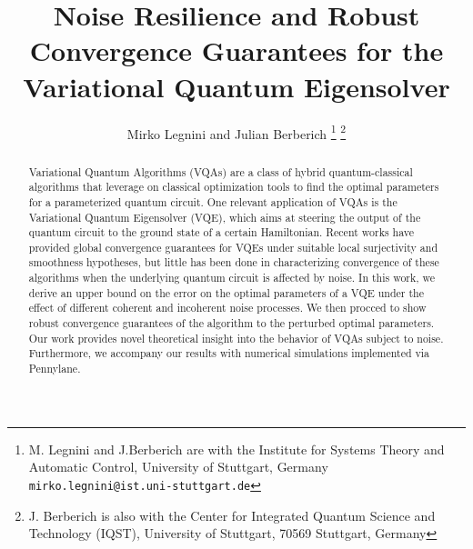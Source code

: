 \documentclass[letterpaper, 10 pt]{IEEEtran}  %
\title{\LARGE \bf
Noise Resilience and Robust Convergence Guarantees for the Variational Quantum Eigensolver
}
\author{Mirko Legnini and Julian Berberich%
\thanks{M. Legnini and J.Berberich are with the Institute for Systems Theory and Automatic Control,
        University of Stuttgart, Germany
        {\tt\small mirko.legnini@ist.uni-stuttgart.de}}%
\thanks{J. Berberich is also with the Center for Integrated Quantum Science and Technology (IQST), University of Stuttgart, 70569 Stuttgart, Germany}
}
\begin{document}
\maketitle
\thispagestyle{empty}
\pagestyle{empty}

\begin{abstract}
Variational Quantum Algorithms (VQAs) are a class of hybrid quantum-classical algorithms that leverage on classical optimization tools to find the optimal parameters for a parameterized quantum circuit.  One relevant application of VQAs is the Variational Quantum Eigensolver (VQE), which aims at steering the output of the quantum circuit to the ground state of a certain Hamiltonian. Recent works have provided global convergence guarantees for VQEs under suitable local surjectivity and smoothness hypotheses, but little has been done in characterizing convergence of these algorithms when the underlying quantum circuit is affected by noise.  
In this work, we derive an upper bound on the error on the optimal parameters of a VQE under the effect of different coherent and incoherent noise processes. We then procced to show robust convergence guarantees of the algorithm to the perturbed optimal parameters. Our work provides novel theoretical insight into the behavior of VQAs subject to noise. 
Furthermore, we accompany our results with numerical simulations implemented via Pennylane.    

\end{abstract}

\end{document}
